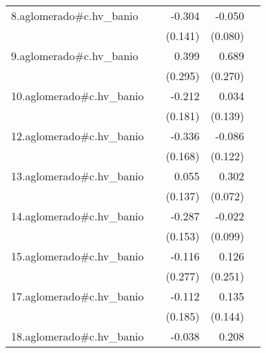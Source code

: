 {\begin{longtable}{l*{4}{D{.}{.}{-1}}}
\addlinespace
8.aglomerado#c.hv\_banio&                     &      -0.304\sym{*}  &      -0.050         &                     \\
            &                     &     (0.141)         &     (0.080)         &                     \\
\addlinespace
9.aglomerado#c.hv\_banio&                     &       0.399         &       0.689\sym{*}  &                     \\
            &                     &     (0.295)         &     (0.270)         &                     \\
\addlinespace
10.aglomerado#c.hv\_banio&                     &      -0.212         &       0.034         &                     \\
            &                     &     (0.181)         &     (0.139)         &                     \\
\addlinespace
12.aglomerado#c.hv\_banio&                     &      -0.336\sym{*}  &      -0.086         &                     \\
            &                     &     (0.168)         &     (0.122)         &                     \\
\addlinespace
13.aglomerado#c.hv\_banio&                     &       0.055         &       0.302\sym{***}&                     \\
            &                     &     (0.137)         &     (0.072)         &                     \\
\addlinespace
14.aglomerado#c.hv\_banio&                     &      -0.287         &      -0.022         &                     \\
            &                     &     (0.153)         &     (0.099)         &                     \\
\addlinespace
15.aglomerado#c.hv\_banio&                     &      -0.116         &       0.126         &                     \\
            &                     &     (0.277)         &     (0.251)         &                     \\
\addlinespace
17.aglomerado#c.hv\_banio&                     &      -0.112         &       0.135         &                     \\
            &                     &     (0.185)         &     (0.144)         &                     \\
\addlinespace
18.aglomerado#c.hv\_banio&                     &      -0.038         &       0.208\sym{**} &                     \\

\end{longtable}}
